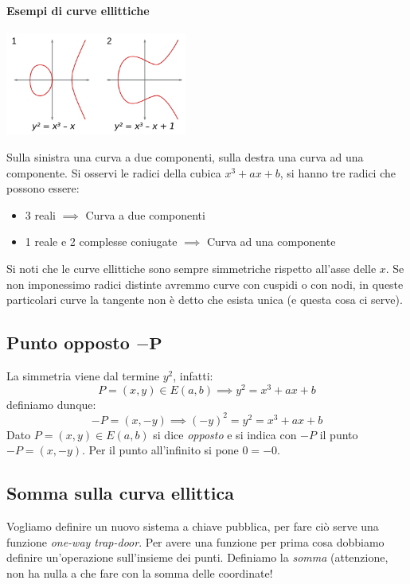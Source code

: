 \paragraph{Esempi di curve ellittiche}
\begin{center}
    \includegraphics[width=225px]{images/ECC_1.png}
\end{center}
Sulla sinistra una curva a due componenti, sulla destra una curva ad una componente.
Si osservi le radici della cubica $x^3 + ax +b$, si hanno tre radici che possono essere:
\begin{itemize}
    \item 3 reali $\implies$ Curva a due componenti
    \item 1 reale e 2 complesse coniugate $\implies$ Curva ad una componente
\end{itemize}
 {{Si noti che le curve ellittiche sono sempre simmetriche rispetto all'asse delle $x$}}. Se non imponessimo radici distinte avremmo curve con cuspidi o con nodi, in queste particolari curve la tangente non è detto che esista unica (e questa cosa ci serve).

\subsection{Punto opposto $\mathbf{-P}$} La simmetria viene dal termine $y^2$, infatti:
$$ P = (x,y) \in E(a,b) \implies y^2 = x^3 + ax + b $$
definiamo dunque:
$$ -P = (x,-y) \implies (-y)^2 = y^2 = x^3 + ax + b $$
Dato $P=(x,y) \in E(a,b) $ si dice \emph{opposto} e si indica con $-P$ il punto $-P=(x,-y)$. Per il punto all'infinito si pone $0=-0$.

\subsection{Somma sulla curva ellittica}
Vogliamo definire un nuovo sistema a chiave pubblica, per fare ciò serve una funzione \emph{one-way trap-door}. Per avere una funzione per prima cosa dobbiamo definire un'operazione sull'insieme dei punti. Definiamo la \textit{somma} (attenzione, non ha nulla a che fare con la somma delle coordinate!
